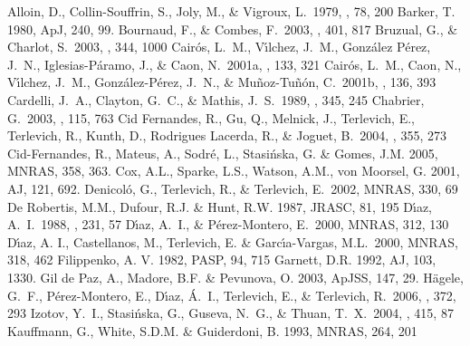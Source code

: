 \documentclass[structabstract]{aa}
\begin{document}
\begin{thebibliography}{}


 Alloin, D., 
Collin-Souffrin, S., Joly, M., \& Vigroux, L.\ 1979, \aap, 78, 200 
\bibitem{} Barker, T. 1980, ApJ, 240, 99.
 Bournaud, F., \& 
Combes, F.\ 2003, \aap, 401, 817 
 Bruzual, G., \& 
Charlot, S.\ 2003, \mnras, 344, 1000 
 Cair{\'o}s, L.~M., 
V{\'{\i}}lchez, J.~M., Gonz{\'a}lez P{\'e}rez, J.~N., Iglesias-P{\'a}ramo, 
J., \& Caon, N.\ 2001a, \apjs, 133, 321 
 Cair{\'o}s, L.~M., 
Caon, N., V{\'{\i}}lchez, J.~M., Gonz{\'a}lez-P{\'e}rez, J.~N., \& 
Mu{\~n}oz-Tu{\~n}{\'o}n, C.\ 2001b, \apjs, 136, 393 
 Cardelli, J.~A., Clayton, G.~C., \& Mathis, J.~S.\ 1989, \apj, 345, 245 
 Chabrier, G.\ 2003, \pasp, 
115, 763 
 Cid Fernandes, 
R., Gu, Q., Melnick, J., Terlevich, E., Terlevich, R., Kunth, D., Rodrigues 
Lacerda, R., \& Joguet, B.\ 2004, \mnras, 355, 273 
\bibitem{} Cid-Fernandes, R., Mateus, A., Sodr\'e, L., Stasi{\'n}ska, G. \& Gomes, J.M. 2005, MNRAS, 358, 363.
\bibitem{} Cox, A.L., Sparke, L.S., Watson, A.M., von Moorsel, G. 2001, AJ, 121, 692.
 Denicol{\'o}, G., 
Terlevich, R., \& Terlevich, E.\ 2002, MNRAS, 330, 69 
\bibitem{} De Robertis, M.M., Dufour, R.J. \& Hunt, R.W. 1987, JRASC, 81, 195
 D\'\i az, A.~I.\ 1988, \mnras, 231, 57 
 D{\'{\i}}az, A.~I., \& P{\'e}rez-Montero, E.\ 2000, MNRAS, 312, 130 
\bibitem[D{\'{\i}}az et al. (2000)]{} D\'\i az, A. I., Castellanos, M., Terlevich, E. \& Garc\'\i a-Vargas, M.L.\ 2000, MNRAS, 318, 462 
\bibitem{} Filippenko, A. V. 1982, PASP, 94, 715
\bibitem{} Garnett, D.R. 1992, AJ, 103, 1330.
\bibitem{} Gil de Paz, A., Madore, B.F. \& Pevunova, O. 2003, ApJSS, 147, 29.
 H{\"a}gele, G.~F., 
P{\'e}rez-Montero, E., D{\'{\i}}az, {\'A}.~I., Terlevich, E., \& Terlevich, 
R.\ 2006, \mnras, 372, 293 
 Izotov, Y.~I., 
Stasi{\'n}ska, G., Guseva, N.~G., \& Thuan, T.~X.\ 2004, \aap, 415, 87 
\bibitem{}  Kauffmann, G., White, S.D.M. \& Guiderdoni, B. 1993, MNRAS, 264, 201

\end{thebibliography}
\end{document}
